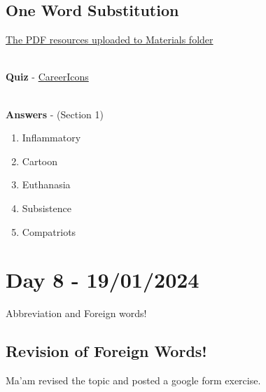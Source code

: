 \documentclass[a4paper,30pt]{report}
\begin{document}
    \section{One Word Substitution}
      \underline{The PDF resources uploaded to Materials folder}\\\\

      \par \textbf{Quiz} - \href{https://careericons.com/general-english-mcq/one-word-substitution/section-1-question-answer/154-1/}{CareerIcons}\\\\

      \par \textbf{Answers} - (Section 1) 
        \begin{enumerate}
          \item Inflammatory
          \item Cartoon
          \item Euthanasia
          \item Subsistence
          \item Compatriots
        \end{enumerate}
  


  \chapter{Day 8 - 19/01/2024} %
  \label{chap:Day 8 - 19/01/2024}
    Abbreviation and Foreign words!
    \section{Revision of Foreign Words!}
       Ma'am revised the topic and posted a google form exercise. 
\end{document}
